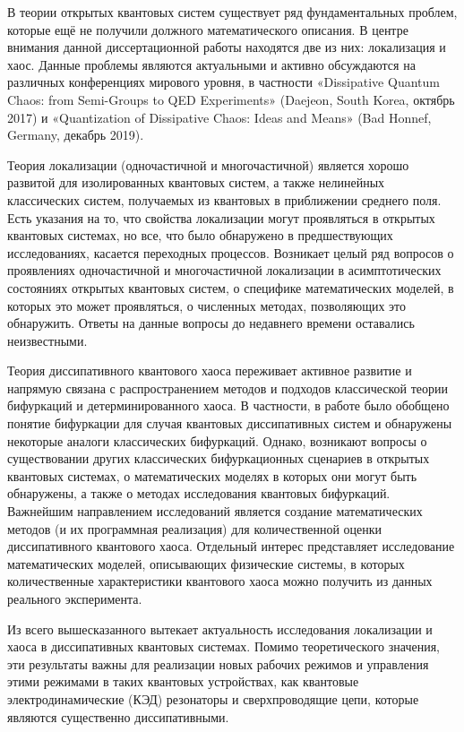 В теории открытых квантовых систем существует ряд фундаментальных проблем, которые ещё не получили должного математического описания.
В центре внимания данной диссертационной работы находятся две из них: локализация и хаос.
Данные проблемы являются актуальными и активно обсуждаются на различных конференциях мирового уровня, в частности «Dissipative Quantum Chaos: from Semi-Groups to QED Experiments» (Daejeon, South Korea, октябрь 2017) и «Quantization of Dissipative Chaos: Ideas and Means» (Bad Honnef, Germany, декабрь 2019).

Теория локализации (одночастичной и многочастичной) является хорошо развитой для изолированных квантовых систем, а также нелинейных классических систем, получаемых из квантовых в приближении среднего поля.
Есть указания на то, что свойства локализации могут проявляться в открытых квантовых системах, но все, что было обнаружено в предшествующих исследованиях, касается переходных процессов\autocite{Genway2014}.
Возникает целый ряд вопросов о проявлениях одночастичной и многочастичной локализации в асимптотических состояниях открытых квантовых систем, о специфике математических моделей, в которых это может проявляться, о численных методах, позволяющих это обнаружить. 
Ответы на данные вопросы до недавнего времени оставались неизвестными.

Теория диссипативного квантового хаоса переживает активное развитие и напрямую связана с распространением методов и подходов классической теории бифуркаций и детерминированного хаоса.
В частности, в работе \autocite{Hartmann2017, Ivanchenko2017} было обобщено понятие бифуркации для случая квантовых диссипативных систем и обнаружены некоторые аналоги классических бифуркаций.
Однако, возникают вопросы о существовании других классических бифуркационных сценариев в открытых квантовых системах, о математических моделях в которых они могут быть обнаружены, а также о методах исследования квантовых бифуркаций.
Важнейшим направлением исследований является создание математических методов (и их программная реализация) для количественной оценки диссипативного квантового хаоса.
Отдельный интерес представляет исследование математических моделей, описывающих физические системы, в которых количественные характеристики квантового хаоса можно получить из данных реального эксперимента.

Из всего вышесказанного вытекает актуальность исследования локализации и хаоса в диссипативных квантовых системах. 
Помимо теоретического значения, эти результаты важны для реализации новых рабочих режимов и управления этими режимами в таких квантовых устройствах, как квантовые электродинамические (КЭД) резонаторы \autocite{Imamoglu1999, Walther2006, Arakawa2015} и сверхпроводящие цепи, которые являются существенно диссипативными.

